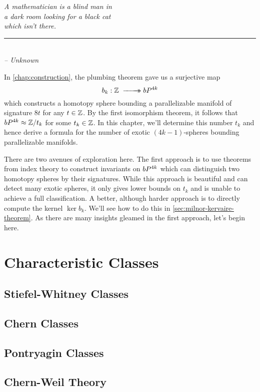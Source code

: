 \begin{flushleft}
	\textsl{A mathematician is a blind man in }\\
	\textsl{a dark room looking for a black cat}\\
	\textsl{which isn’t there.}\\
	\rule[0pt]{15em}{0.5pt}\\
	\textsl{-- Unknown}
	\vspace{2em}
\end{flushleft}

In \cref{chap:construction}, the plumbing theorem gave us a surjective map
\[
		b_k : \Z \lkxsurj \bP^{4k}
\]
which constructs a homotopy sphere bounding a parallelizable manifold of signature $8t$ for any $t\in \mathbb{Z}$. By the first isomorphism theorem, it follows that $bP^{4k}\approx \mathbb{Z}/t_k$ for some $t_k\in \mathbb{Z}$. In this chapter, we'll determine this number $t_k$ and hence derive a formula for the number of exotic $(4k-1)$-spheres bounding parallelizable manifolds. 

There are two avenues of exploration here. The first approach is to use theorems from index theory to construct invariants on $bP^{4k}$ which can distinguish two homotopy spheres by their signatures. While this approach is beautiful and can detect many exotic spheres, it only gives lower bounds on $t_k$ and is unable to achieve a full classification. A better, although harder approach is to directly compute the kernel $\ker b_k$. We'll see how to do this in \cref{sec:milnor-kervaire-theorem}. As there are many insights gleamed in the first approach, let's begin here.

\section{Characteristic Classes}

\subsection{Stiefel-Whitney Classes}
\subsection{Chern Classes}
\subsection{Pontryagin Classes}

\subsection{Chern-Weil Theory}

